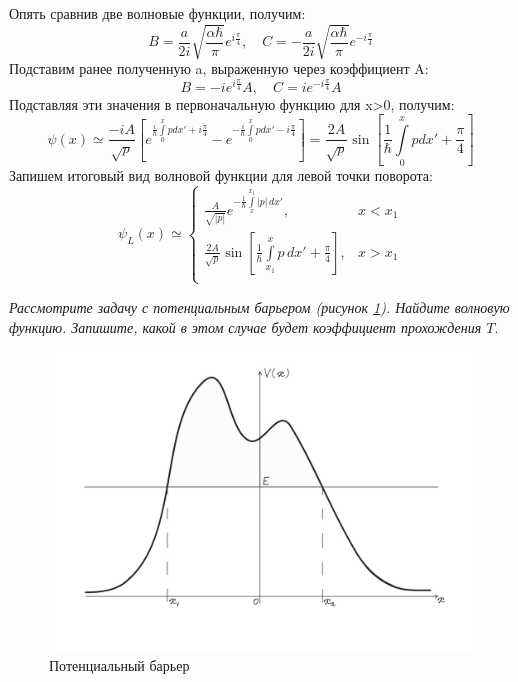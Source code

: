 Опять сравнив две волновые функции, получим:
\[
B = \frac{a}{2i}\sqrt{\frac{\alpha\hbar}{\pi}}e^{i\frac{\pi}{4}},\quad C = -\frac{a}{2i}\sqrt{\frac{\alpha\hbar}{\pi}}e^{-i\frac{\pi}{4}}
\]
Подставим ранее полученную a, выраженную через коэффициент A:
\[
B = -ie^{i\frac{\pi}{4}}A,\quad C = ie^{-i\frac{\pi}{4}}A
\]
Подставляя эти значения в первоначальную функцию для x>0, получим:
\[
\psi(x) \simeq \frac{-iA}{\sqrt{p}}\left[ e^{\frac{i}{\hbar}\int\limits_{0}^{x} p dx' + i\frac{\pi}{4}} - e^{-\frac{i}{\hbar}\int\limits_{0}^{x} p dx' - i\frac{\pi}{4}} \right] = \frac{2A}{\sqrt{p}}\sin\left[ \frac{1}{\hbar} \int\limits_0^{x}p dx' + \frac{\pi}{4} \right]
\]
Запишем итоговый вид волновой функции для левой точки поворота:
\[
\psi_L(x) \simeq 
\begin{cases}
    \frac{A}{\sqrt{|p|}}e^{-\frac{1}{\hbar} \int\limits_{x}^{x_1} |p|\,dx'}, & x < x_1\\
    \frac{2A}{\sqrt{p}}\sin\left[ \frac{1}{\hbar} \int\limits_{x_1}^{x} p\,dx' + \frac{\pi}{4} \right], & x > x_1\\
\end{cases}
\]
\newpage
{}
\begin{center}
\textit{Рассмотрите задачу с потенциальным барьером (рисунок \ref{fig C.2}). Найдите волновую функцию. Запишите, какой в этом случае будет коэффициент прохождения $T$}.
\end{center}

\begin{figure}[h!]
\centering
\includegraphics[scale=0.16]{appendix/images/barier.jpg}
\caption{Потенциальный барьер}
\label{fig C.2}
\end{figure}

